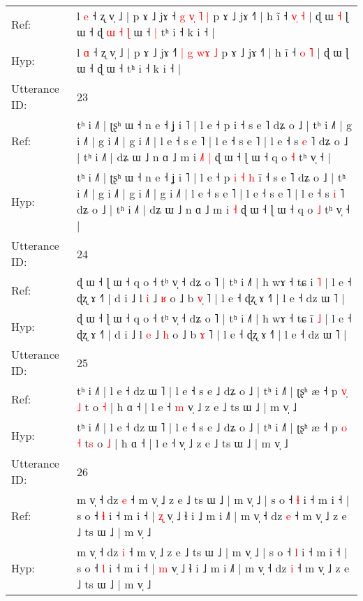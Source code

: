 \documentclass[10pt]{article}
\DeclareRobustCommand{\hl}[1]{{\textcolor{red}{#1}}}
\begin{document}
\begin{longtable}{ll}
Ref: & l \hl{e} ˧ ʐ v̩ ˩ | p ɤ ˩ jɤ ˧\hl{} \hl{g} \hl{v}\hl{̩}\hl{ }\hl{˥} \hl{|} p ɤ ˩ jɤ ˧˥ | h ĩ ˧ \hl{v}\hl{̩} \hl{˧} | ɖ ɯ\hl{ }\hl{˧} ɭ ɯ ˧ ɖ\hl{ }\hl{ɯ}\hl{ }\hl{˧}\hl{ }\hl{ɭ} ɯ ˧\hl{ }\hl{|} tʰ i ˧ k i ˧ |
 \\
Hyp: & l \hl{ɑ} ˧ ʐ v̩ ˩ | p ɤ ˩ jɤ ˧\hl{˥} \hl{|} \hl{g}\hl{ }\hl{w}\hl{ɤ} \hl{˩} p ɤ ˩ jɤ ˧˥ | h ĩ ˧ \hl{}\hl{o} \hl{˥} | ɖ ɯ\hl{}\hl{} ɭ ɯ ˧ ɖ\hl{}\hl{}\hl{}\hl{}\hl{}\hl{} ɯ ˧\hl{}\hl{} tʰ i ˧ k i ˧ |
 \\
\midrule
Utterance ID: & 23 \\
Ref: & tʰ i ˩˥ | ʈʂʰ ɯ ˧ n e ˧ ʝ i ˥ | l e ˧ p\hl{}\hl{}\hl{}\hl{}\hl{}\hl{} i\hl{} ˧ s e ˥ dʑ o ˩ | tʰ i ˩˥ | g i ˩˥ | g i ˩˥ | g i ˩˥ | l e ˧ s e ˥ | l e ˧ s e ˥ | l e ˧ s \hl{e} ˥ dʑ o ˩ | tʰ i ˩˥ | dʑ ɯ ˩ n ɑ ˩ m i\hl{ }\hl{˩}\hl{˥} \hl{|} ɖ ɯ ˧ ɭ ɯ ˧ q o \hl{˧} tʰ v̩ ˧ |
 \\
Hyp: & tʰ i ˩˥ | ʈʂʰ ɯ ˧ n e ˧ ʝ i ˥ | l e ˧ p\hl{ }\hl{i}\hl{ }\hl{˧}\hl{ }\hl{h} i\hl{̃} ˧ s e ˥ dʑ o ˩ | tʰ i ˩˥ | g i ˩˥ | g i ˩˥ | g i ˩˥ | l e ˧ s e ˥ | l e ˧ s e ˥ | l e ˧ s \hl{i} ˥ dʑ o ˩ | tʰ i ˩˥ | dʑ ɯ ˩ n ɑ ˩ m i\hl{}\hl{}\hl{} \hl{˧} ɖ ɯ ˧ ɭ ɯ ˧ q o \hl{˩} tʰ v̩ ˧ |
 \\
\midrule
Utterance ID: & 24 \\
Ref: & ɖ ɯ ˧ ɭ ɯ ˧ q o ˧ tʰ v̩ ˧ dʑ o ˥ | tʰ i ˩˥ | h wɤ ˧ tɕ i\hl{} \hl{˥} | l e ˧ ɖʐ ɤ ˧˥ | d i ˩ l \hl{i} ˩ \hl{ʁ} o ˩ b \hl{v}\hl{̩} ˥ | l e ˧ ɖʐ ɤ ˧˥ | l e ˧ dz ɯ ˥ |
 \\
Hyp: & ɖ ɯ ˧ ɭ ɯ ˧ q o ˧ tʰ v̩ ˧ dʑ o ˥ | tʰ i ˩˥ | h wɤ ˧ tɕ i\hl{̃} \hl{˩} | l e ˧ ɖʐ ɤ ˧˥ | d i ˩ l \hl{e} ˩ \hl{h} o ˩ b \hl{}\hl{ɤ} ˥ | l e ˧ ɖʐ ɤ ˧˥ | l e ˧ dz ɯ ˥ |
 \\
\midrule
Utterance ID: & 25 \\
Ref: & tʰ i ˩˥ | l e ˧ dz ɯ ˥ | l e ˧ s e ˩ dʑ o ˩ | tʰ i ˩˥ | ʈʂʰ æ ˧ p \hl{v}\hl{̩} \hl{˩} t\hl{} o \hl{˧} | h ɑ ˧ | l e ˧\hl{ }\hl{m} v̩ ˩ z e ˩ ts ɯ ˩ | m v̩ ˩
 \\
Hyp: & tʰ i ˩˥ | l e ˧ dz ɯ ˥ | l e ˧ s e ˩ dʑ o ˩ | tʰ i ˩˥ | ʈʂʰ æ ˧ p \hl{}\hl{o} \hl{˧} t\hl{s} o \hl{˩} | h ɑ ˧ | l e ˧\hl{}\hl{} v̩ ˩ z e ˩ ts ɯ ˩ | m v̩ ˩
 \\
\midrule
Utterance ID: & 26 \\
Ref: & m v̩ ˧ dz \hl{e} ˧ m v̩ ˩ z e ˩ ts ɯ ˩ | m v̩ ˩ | s o ˧ \hl{ɬ} i ˧ m i ˧ | s o ˧ \hl{ɬ} i ˧ m i ˧ | \hl{ʐ} v̩ ˩ ɬ i ˩ m i ˩˥ | m v̩ ˧ dz \hl{e} ˧ m v̩ ˩ z e ˩ ts ɯ ˩ | m v̩ ˩
 \\
Hyp: & m v̩ ˧ dz \hl{i} ˧ m v̩ ˩ z e ˩ ts ɯ ˩ | m v̩ ˩ | s o ˧ \hl{l} i ˧ m i ˧ | s o ˧ \hl{l} i ˧ m i ˧ | \hl{m} v̩ ˩ ɬ i ˩ m i ˩˥ | m v̩ ˧ dz \hl{i} ˧ m v̩ ˩ z e ˩ ts ɯ ˩ | m v̩ ˩

\end{longtable}
\end{document}
